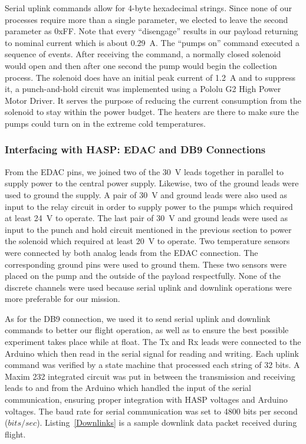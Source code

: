 Serial uplink commands allow for 4-byte hexadecimal strings.  Since none of our processes require more than a single parameter, we elected to leave the second parameter as 0xFF.  Note that every ``disengage'' results in our payload returning to nominal current which is about \SI{0.29}{\ampere}.  The ``pumps on'' command executed a sequence of events. After receiving the command, a normally closed solenoid would open and then after one second the pump would begin the collection process.  The solenoid does have an initial peak current of \SI{1.2}{\ampere} and to suppress it, a punch-and-hold circuit was implemented using a Pololu G2 High Power Motor Driver.  It serves the purpose of reducing  the current consumption from the solenoid to stay within the power budget.  The heaters are there to make sure the pumps could turn on in the extreme cold temperatures.  

\subsubsection{Interfacing with HASP: EDAC and DB9 Connections}

From the EDAC pins, we joined two of the \SI{30}{\volt} leads together in parallel to supply power to the central power supply.  Likewise, two of the ground leads were used to ground the supply.  A pair of \SI{30}{\volt} and ground leads were also used as input to the relay circuit in order to supply power to the pumps which required at least \SI{24}{\volt} to operate.  The last pair of \SI{30}{\volt} and ground leads were used as input to the punch and hold circuit mentioned in the previous section to power the solenoid which required at least \SI{20}{\volt} to operate.  Two temperature sensors were connected by both analog leads from the EDAC connection.  The corresponding ground pins were used to ground them.  These two sensors were placed on the pump and the outside of the payload respectfully.  None of the discrete channels were used because serial uplink and downlink operations were more preferable for our mission.

As for the DB9 connection, we used it to send serial uplink and downlink commands to better our flight operation, as well as to ensure the best possible experiment takes place while at float.  The Tx and Rx leads were connected to the Arduino which then read in the serial signal for reading and writing.  Each uplink command was verified by a state machine that processed each string of \num{32} bits.  A Maxim 232 integrated circuit was put in between the transmission and receiving leads to and from the Arduino which handled the input of the serial communication, ensuring proper integration with HASP voltages and Arduino voltages.  The baud rate for serial communication was set to 4800 bits per second ($bits/sec$). Listing~\ref{Downlinks} is a sample downlink data packet received during flight.

